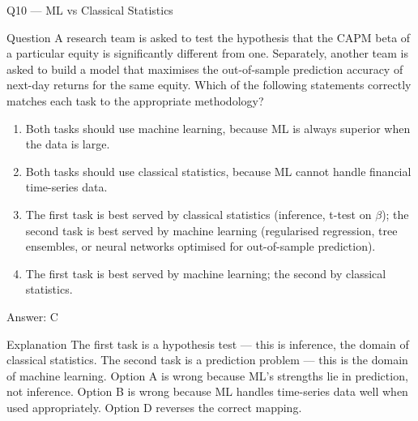\documentclass[aspectratio=169,8pt]{beamer}
\begin{document}
	\begin{frame}{Q10 --- ML vs Classical Statistics}
		\begin{block}{Question}
			A research team is asked to test the hypothesis that the CAPM beta of a particular equity is significantly different from one. Separately, another team is asked to build a model that maximises the out-of-sample prediction accuracy of next-day returns for the same equity. Which of the following statements correctly matches each task to the appropriate methodology?
		\end{block}
		\begin{enumerate}
			\item Both tasks should use machine learning, because ML is always superior when the data is large.
			\item Both tasks should use classical statistics, because ML cannot handle financial time-series data.
			\item The first task is best served by classical statistics (inference, t-test on $\beta$); the second task is best served by machine learning (regularised regression, tree ensembles, or neural networks optimised for out-of-sample prediction).
			\item The first task is best served by machine learning; the second by classical statistics.
		\end{enumerate}
		\begin{exampleblock}{Answer: C}\end{exampleblock}
		\begin{block}{Explanation}
			The first task is a hypothesis test --- this is inference, the domain of classical statistics. The second task is a prediction problem --- this is the domain of machine learning. Option A is wrong because ML's strengths lie in prediction, not inference. Option B is wrong because ML handles time-series data well when used appropriately. Option D reverses the correct mapping.
		\end{block}
	\end{frame}
	
\end{document}
